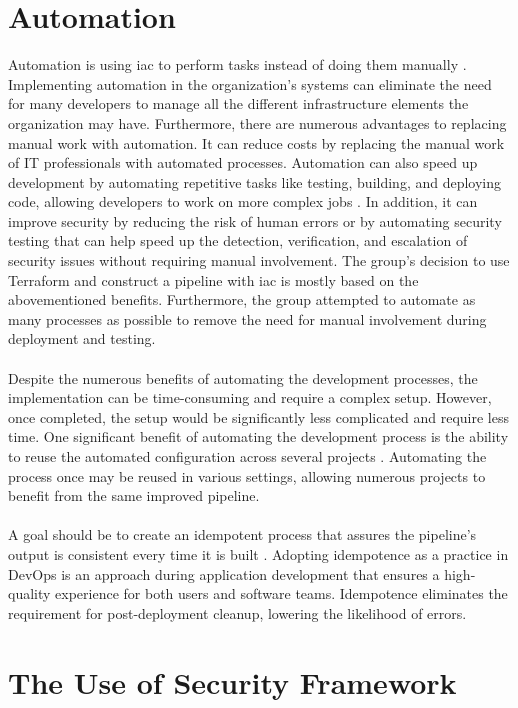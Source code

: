 \section{Automation}
Automation is using \gls{iac} to perform tasks instead of doing them manually \cite{automationredhat}. Implementing automation in the organization's systems can eliminate the need for many developers to manage all the different infrastructure elements the organization may have. Furthermore, there are numerous advantages to replacing manual work with automation. It can reduce costs by replacing the manual work of IT professionals with automated processes. Automation can also speed up development by automating repetitive tasks like testing, building, and deploying code, allowing developers to work on more complex jobs \cite{automation}. In addition, it can improve security by reducing the risk of human errors or by automating security testing that can help speed up the detection, verification, and escalation of security issues without requiring manual involvement. The group's decision to use Terraform and construct a pipeline with \gls{iac} is mostly based on the abovementioned benefits. Furthermore, the group attempted to automate as many processes as possible to remove the need for manual involvement during deployment and testing. 
\\~\\
Despite the numerous benefits of automating the development processes, the implementation can be time-consuming and require a complex setup. However, once completed, the setup would be significantly less complicated and require less time. One significant benefit of automating the development process is the ability to reuse the automated configuration across several projects \cite{reusepipeline}. Automating the process once may be reused in various settings, allowing numerous projects to benefit from the same improved \gls{pipeline}. 
\\~\\
A goal should be to create an \gls{idempotent} process that assures the pipeline's output is consistent every time it is built \cite{idempotent}. Adopting idempotence as a practice in DevOps is an approach during application development that ensures a high-quality experience for both users and software teams. Idempotence eliminates the requirement for post-deployment cleanup, lowering the likelihood of errors. 

\section{The Use of Security Framework}
